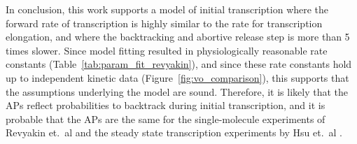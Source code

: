 In conclusion, this work supports a model of initial transcription where the
forward rate of transcription is highly similar to the rate for transcription
elongation, and where the backtracking and abortive release step is more than
5 times slower. Since model fitting resulted in physiologically reasonable
rate constants (Table~\ref{tab:param_fit_revyakin}), and since these rate
constants hold up to independent kinetic data
(Figure~\ref{fig:vo_comparison}), this supports that the assumptions
underlying the model are sound. Therefore, it is likely that the APs
reflect probabilities to backtrack during initial transcription, and it is
probable that the APs are the same for the single-molecule experiments of
Revyakin et.\ al \cite{revyakin_abortive_2006} and the steady state
transcription experiments by Hsu et.\ al \cite{hsu_initial_2006}.
 
